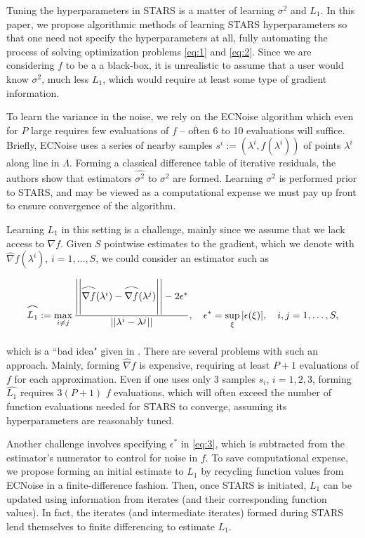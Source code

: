\documentclass{amsart}
\newcommand\reallywidehat[1]{\arraycolsep=0pt\relax%
\begin{array}{c}
\stretchto{
  \scaleto{
    \scalerel*[\widthof{\ensuremath{#1}}]{\kern-.5pt\bigwedge\kern-.5pt}
    {\rule[-\textheight/2]{1ex}{\textheight}} %
  }{\textheight} %
}{0.5ex}\\           %
#1\\                 %
\rule{-1ex}{0ex}
\end{array}
}
\begin{document}
Tuning the hyperparameters in STARS is a matter of learning $\sigma^2$ and $L_1$. In this paper, we propose algorithmic methods of learning STARS hyperparameters so that one need not specify the hyperparameters at all, fully automating the process of solving optimization problems \eqref{eq:1} and \eqref{eq:2}. Since we are considering $f$ to be a a black-box, it is unrealistic to assume that a user would know $\sigma^2$, much less $L_1$, which would require at least some type of gradient information.

To learn the variance in the noise, we rely on the ECNoise algorithm \cite{MW} which even for $P$ large requires few evaluations of $f$ -- often 6 to 10 evaluations will suffice. Briefly, ECNoise uses a series of nearby samples $s^i:=(\lambda^i,f(\lambda^i))$ of points $\lambda^i$ along line in $\Lambda$. Forming a classical difference table of iterative residuals, the authors show that estimators $\hat{\sigma^2}$ to $\sigma^2$ are formed. Learning $\sigma^2$ is performed prior to STARS, and may be viewed as a computational expense we must pay up front to ensure convergence of the algorithm.

Learning $L_1$ in this setting is a challenge, mainly since we assume that we lack access to $\nabla f$. Given $S$ pointwise estimates to the gradient, which we denote with $\hat{\nabla}f(\lambda^i)$, $i=1,\ldots, S$, we could consider an estimator such as



\begin{equation} \label{eq:3}
\reallywidehat{L_1}:= \max_{i \neq j} \frac{\left|\left|\reallywidehat{\nabla f}(\lambda^{i})-\reallywidehat{\nabla f}(\lambda^{j})\right|\right|-2\epsilon^*}{||\lambda^{i}-\lambda^{j}||}, \quad \epsilon^*=\sup_\xi |\epsilon(\xi)|, \quad i,j=1,\ldots, S,
\end{equation} 

\noindent which is a ``bad idea" given in \cite{Calliess}. There are several problems with such an approach. Mainly, forming $\hat{\nabla} f$ is expensive, requiring at least $P+1$ evaluations of $f$ for each approximation. Even if one uses only 3 samples $s_i$, $i=1,2,3$, forming $\hat{L_1}$ requires $3(P+1)$ $f$ evaluations, which will often exceed the number of function evaluations needed for STARS to converge, assuming its hyperparameters are reasonably tuned.

Another challenge involves specifying $\epsilon^*$ in \eqref{eq:3}, which is subtracted from the estimator's numerator to control for noise in $f$. To save computational expense, we propose forming an initial estimate to $L_1$ by recycling function values from ECNoise in a finite-difference fashion. Then, once STARS is initiated, $L_1$ can be updated using information from iterates (and their corresponding function values). In fact, the iterates (and intermediate iterates) formed during STARS lend themselves to finite differencing to estimate $L_1$.
\end{document}
